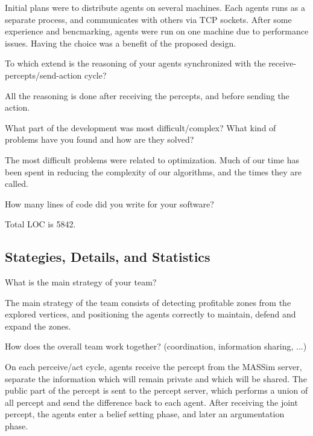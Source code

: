 Initial plans were to distribute agents on several
machines. Each agents runs as a separate process, and communicates with others
via TCP sockets. After some experience and bencmarking, agents were run on one
machine due to performance issues. Having the choice was a benefit of the
proposed design.

\begin{question}
To which extend is the reasoning of your agents synchronized with the
receive-percepts/send-action cycle?
\end{question}

All the reasoning is done after receiving the percepts, and before sending the
action.


\begin{question}
What part of the development was most difficult/complex? What kind of
problems have you found and how are they solved?  
\end{question}

The most difficult problems
were related to optimization. Much of our time has been spent in reducing the
complexity of our algorithms, and the times they are called.

\begin{question}
How many lines of code did you write for your software?  
\end{question}

Total LOC is 5842.

\subsection{Stategies, Details, and Statistics}

\begin{question}
What is the main strategy of your
team?  
\end{question}

The main strategy of the team consists of detecting profitable zones
from the explored vertices, and positioning the agents correctly to maintain,
defend and expand the zones.

\begin{question}
How does the overall team work together? (coordination, information
sharing, ...) 
\end{question}

On each perceive/act cycle, agents receive the percept from the
MASSim server, separate the information which will remain private and which
will be shared.  The public part of the percept is sent to the percept server,
which performs a union of all percept and send the difference back to each
agent. After receiving the joint percept, the agents enter a belief setting
phase, and later an argumentation phase.


